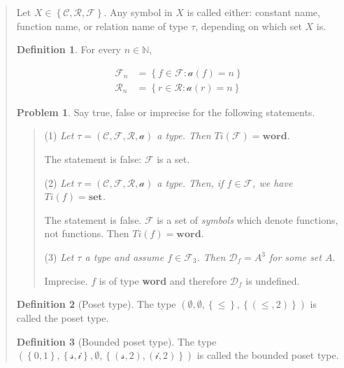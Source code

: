 \documentclass[a4paper, 12pt]{article}
\theoremstyle{definition}
\newtheorem{problem}{Problem}
\theoremstyle{definition}
\theoremstyle{definition}
\newtheorem{definition}{Definition}
\begin{document}
\begin{quote}
\begin{quote}
\end{quote}
\normalsize

Let $X \in \left\{ \mathcal{C}, \mathcal{R}, \mathcal{F} \right\} $. Any symbol
in $X$ is called either: constant name, function name, or relation name of type
$\tau$, depending on which set $X$ is.

\begin{definition}
    For every $n \in \mathbb{N}$, 

    \begin{align*}
        \mathcal{F}_n &= \left\{ f \in \mathcal{F} : \mathcal{a}(f) = n \right\} \\
        \mathcal{R}_n &= \left\{ r \in \mathcal{R} : \mathcal{a}(r) = n \right\} 
    \end{align*}
\end{definition}

\begin{problem}
    Say true, false or imprecise for the following statements. 
\end{problem}


\small
\begin{quote}

    (1) \textit{Let $\tau = \left( \mathcal{C}, \mathcal{F}, \mathcal{R}, \mathcal{a} \right) $ a type. Then 
    $Ti(\mathcal{F}) = \textbf{word}$}.

    The statement is false: $\mathcal{F}$ is a set.

    (2) \textit{Let $\tau = \left( \mathcal{C}, \mathcal{F}, \mathcal{R}, \mathcal{a} \right) $ a type. Then, 
    if $f \in \mathcal{F}$, we have $Ti(f) = \textbf{set}$.}

    The statement is false. $\mathcal{F}$ is a set of \textit{symbols} which denote 
    functions, not functions. Then $Ti(f) = \textbf{word}$.

    (3) \textit{Let $\tau$ a type and assume $f \in \mathcal{F}_3$. Then $\mathcal{D}_f = A^3$ for 
    some set $A$}.

    Imprecise. $f$ is of type \textbf{word} and therefore $\mathcal{D}_f$ is 
    undefined.

\end{quote}
\normalsize


\begin{definition}[Poset type]
    The type $(\emptyset, \emptyset, \left\{ \leq \right\}, \left\{ (\leq, 2) \right\} ) $ is called 
    the poset type.
\end{definition}

\begin{definition}[Bounded poset type]
    The type $\left( \left\{ 0, 1 \right\}, \left\{ \mathcal{s}, \mathcal{i} \right\},  \emptyset, \left\{ (\mathcal{s}, 2), (\mathcal{i}, 2) \right\}    \right) $ is called the bounded poset type.
\end{definition}


\end{quote}
\end{document}

